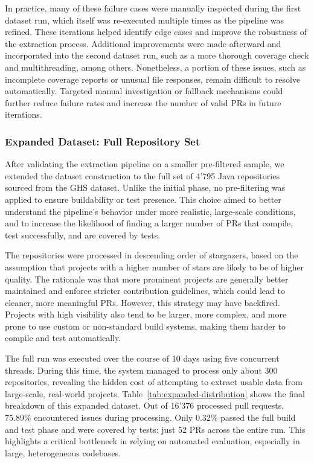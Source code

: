 In practice, many of these failure cases were manually inspected during the first dataset run, which
itself was re-executed multiple times as the pipeline was refined. These iterations helped identify
edge cases and improve the robustness of the extraction process. Additional improvements were made
afterward and incorporated into the second dataset run, such as a more thorough coverage check and
multithreading, among others. Nonetheless, a portion of these issues, such as incomplete
coverage reports or unusual file responses, remain difficult to resolve automatically. Targeted
manual investigation or fallback mechanisms could further reduce failure rates and increase the
number of valid PRs in future iterations.

\subsubsection{Expanded Dataset: Full Repository Set}
\label{sec:stat-expanded}

After validating the extraction pipeline on a smaller pre-filtered sample, we extended the dataset
construction to the full set of 4'795 Java repositories sourced from the GHS dataset. Unlike the
initial phase, no pre-filtering was applied to ensure buildability or test presence. This choice
aimed to better understand the pipeline’s behavior under more realistic, large-scale conditions, and
to increase the likelihood of finding a larger number of PRs that compile, test successfully, and
are covered by tests.

The repositories were processed in descending order of stargazers, based on the assumption that
projects with a higher number of stars are likely to be of higher quality. The rationale was that
more prominent projects are generally better maintained and enforce stricter contribution
guidelines, which could lead to cleaner, more meaningful PRs. However, this strategy may have
backfired. Projects with high visibility also tend to be larger, more complex, and more prone to use
custom or non-standard build systems, making them harder to compile and test automatically.

The full run was executed over the course of 10 days using five concurrent threads. During this
time, the system managed to process only about 300 repositories, revealing the hidden cost of
attempting to extract usable data from large-scale, real-world projects.
Table~\ref{tab:expanded-distribution} shows the final breakdown of this expanded dataset. Out of
16'376 processed pull requests, 75.89\% encountered issues during processing. Only 0.32\% passed the
full build and test phase and were covered by tests: just 52 PRs across the entire run. This
highlights a critical bottleneck in relying on automated evaluation, especially in large,
heterogeneous codebases.

